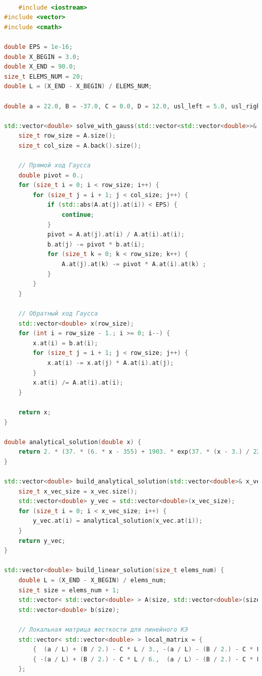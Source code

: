 \begin{lstlisting}[language=c++, label=prog,caption={\textit{Реализация МКЭ}}]

	#include <iostream>
#include <vector>
#include <cmath>

double EPS = 1e-16;
double X_BEGIN = 3.0;
double X_END = 90.0;
size_t ELEMS_NUM = 20;
double L = (X_END - X_BEGIN) / ELEMS_NUM;

double a = 22.0, B = -37.0, C = 0.0, D = 12.0, usl_left = 5.0, usl_right = 10.0; // au"+Bu'+Cu+D=0

std::vector<double> solve_with_gauss(std::vector<std::vector<double>>& A, std::vector<double>& b){
    size_t row_size = A.size();
    size_t col_size = A.back().size();

    // Прямой ход Гаусса
    double pivot = 0.;
    for (size_t i = 0; i < row_size; i++) {
        for (size_t j = i + 1; j < col_size; j++) {
            if (std::abs(A.at(j).at(i)) < EPS) {
                continue;
            }
            pivot = A.at(j).at(i) / A.at(i).at(i);
            b.at(j) -= pivot * b.at(i);
            for (size_t k = 0; k < row_size; k++) {
                A.at(j).at(k) -= pivot * A.at(i).at(k) ;
            }
        }
    }

    // Обратный ход Гаусса
    std::vector<double> x(row_size);
    for (int i = row_size - 1.; i >= 0; i--) {
        x.at(i) = b.at(i);
        for (size_t j = i + 1; j < row_size; j++) {
            x.at(i) -= x.at(j) * A.at(i).at(j);
        }
        x.at(i) /= A.at(i).at(i);
    }

    return x;
}

double analytical_solution(double x) {
    return 2. * (37. * (6. * x - 355) + 1903. * exp(37. * (x - 3.) / 22) - 1903. * exp(3219./22.)) / 1369.;
}

std::vector<double> build_analytical_solution(std::vector<double>& x_vec) {
    size_t x_vec_size = x_vec.size();
    std::vector<double> y_vec = std::vector<double>(x_vec_size);
    for (size_t i = 0; i < x_vec_size; i++) {
        y_vec.at(i) = analytical_solution(x_vec.at(i));
    }
    return y_vec;
}

std::vector<double> build_linear_solution(size_t elems_num) {
    double L = (X_END - X_BEGIN) / elems_num;
    size_t size = elems_num + 1;
    std::vector< std::vector<double> > A(size, std::vector<double>(size));
    std::vector<double> b(size);

    // Локальная матрица жесткости для линейного КЭ
    std::vector< std::vector<double> > local_matrix = {
        {  (a / L) + (B / 2.) - C * L / 3., -(a / L) - (B / 2.) - C * L / 6.},
        { -(a / L) + (B / 2.) - C * L / 6.,  (a / L) - (B / 2.) - C * L / 3.},
    };


\end{lstlisting}

